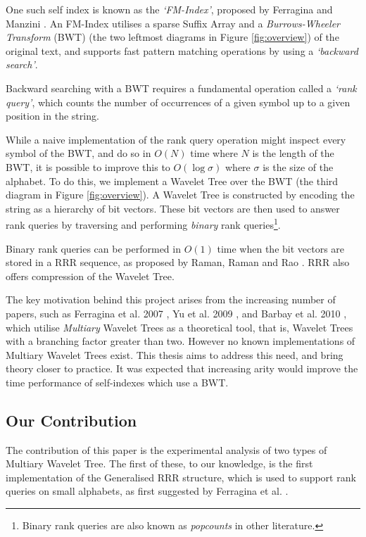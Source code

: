 One such self index is known as the \emph{`FM-Index'}, proposed by
Ferragina and Manzini \cite{ferragina2000}. An FM-Index utilises a 
sparse Suffix Array and a \emph{Burrows-Wheeler Transform} (BWT) \cite{burrows1994} (the two leftmost 
diagrams in Figure \ref{fig:overview}) of the original text, and supports fast 
pattern matching operations by using a \emph{`backward search'}.

Backward searching with a BWT requires a fundamental operation called a 
\emph{`rank query'}, which counts the number of occurrences of a given symbol up 
to a given position in the string.

While a naive implementation of the rank query operation might inspect every 
symbol of the BWT, and do so in $O(N)$ time where $N$ is the length of the BWT, 
it is possible to improve this to $O(\log \sigma)$ where $\sigma$ is the size of 
the alphabet. To do this, we implement a Wavelet Tree \cite{grossi2003} over the BWT (the third 
diagram in Figure 
\ref{fig:overview}). A Wavelet Tree is constructed by encoding the string as a 
hierarchy of bit vectors. These bit vectors are then used to answer rank 
queries by traversing and performing \emph{binary} rank queries\footnote{ Binary rank queries are also known as \emph{popcounts} in other literature.}.

Binary rank queries can be performed in $O(1)$ time when the bit vectors are stored in
a RRR sequence, as proposed by Raman, Raman and Rao \cite{raman2007}. RRR also 
offers compression of the Wavelet Tree.

The key motivation behind this project arises from the increasing number of
papers, such as Ferragina et al. 2007
\cite{ferragina2007}, Yu et al. 2009 \cite{yu2009}, and Barbay et al. 2010
\cite{barbay2010}, which utilise \emph{Multiary} Wavelet Trees as a theoretical 
tool, that is, Wavelet Trees with a branching 
factor greater than two. However no known implementations of Multiary Wavelet 
Trees exist. This thesis aims to address this need, and bring theory closer to 
practice. It was expected that increasing arity would improve the time 
performance of self-indexes which use a BWT.


\subsection{Our Contribution}

The contribution of this paper is the experimental analysis of two types of 
Multiary Wavelet Tree. 
The first of these, to our knowledge, is the first implementation of the Generalised RRR structure, which is used to support rank queries on small 
alphabets, as first suggested by Ferragina et al. \cite{ferragina2007}.

